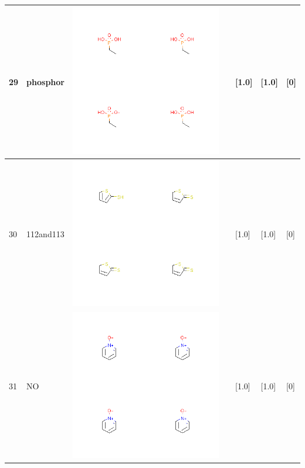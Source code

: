 \begin{longtable}{|l|l|l|l|l|l|l|}
\hline
29 & phosphor & \includegraphics[scale=0.6]{phosphorCA.png} & & [1.0]& [1.0] & [0] \\
\hline
30 & 112and113 & \includegraphics[scale=0.6]{112and113CA.png} & & [1.0]& [1.0] & [0] \\
\hline
31 & NO & \includegraphics[scale=0.6]{NOCA.png} & & [1.0]& [1.0] & [0] \\

\end{longtable}
